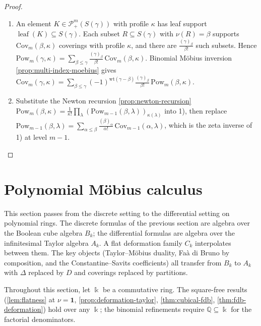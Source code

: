 \documentclass[10pt,a4paper]{article}
\theoremstyle{plain}
\theoremstyle{definition}
\newcommand{\IQ}{\mathbb{Q}} %
\newcommand{\ik}{\Bbbk} %
\newcommand{\1}{\mathbb{1}} %
\newcommand{\KP}{\mathcal{P}}
\newcommand{\Cov}{\mathrm{Cov}} %
\DeclareMathOperator{\lf}{\mathrm{leaf}} %
\begin{document}
\begin{proof}

\begin{enumerate}
\def\labelenumi{\arabic{enumi})}
\item
  An element \(K \in \KP_+^m(S(\gamma))\) with profile \(\kappa\) has
  leaf support \(\lf(K) \subseteq S(\gamma)\). Each subset
  \(R \subseteq S(\gamma)\) with \(\nu(R) = \beta\) supports
  \(\Cov_m(\beta, \kappa)\) coverings with profile \(\kappa\), and there
  are \(\frac{(\gamma)_\beta}{\beta!}\) such subsets. Hence
  \(\mathrm{Pow}_m(\gamma, \kappa) = \sum_{\beta \leq \gamma} \frac{(\gamma)_\beta}{\beta!}\, \Cov_m(\beta, \kappa)\).
  Binomial Möbius inversion \ref{prop:multi-index-moebius} gives
  \(\Cov_m(\gamma, \kappa) = \sum_{\beta \leq \gamma} (-1)^{\mathrm{wt}(\gamma-\beta)} \frac{(\gamma)_\beta}{\beta!}\, \mathrm{Pow}_m(\beta, \kappa)\).
\item
  Substitute the Newton recursion \ref{prop:newton-recursion}
  \(\mathrm{Pow}_m(\beta, \kappa) = \frac{1}{\kappa!} \prod_\lambda (\mathrm{Pow}_{m-1}(\beta, \lambda))_{\kappa(\lambda)}\)
  into 1), then replace
  \(\mathrm{Pow}_{m-1}(\beta, \lambda) = \sum_{\alpha \leq \beta} \frac{(\beta)_\alpha}{\alpha!}\, \Cov_{m-1}(\alpha, \lambda)\),
  which is the zeta inverse of 1) at level \(m-1\).
\end{enumerate}

\end{proof}

\section{Polynomial Möbius
calculus}\label{polynomial-muxf6bius-calculus}

This section passes from the discrete setting to the differential
setting on polynomial rings. The discrete formulas of the previous
section are algebra over the Boolean cube algebra \(B_k\); the
differential formulas are algebra over the infinitesimal Taylor algebra
\(A_k\). A flat deformation family \(C_k\) interpolates between them.
The key objects (Taylor--Möbius duality, Faà di Bruno by composition,
and the Constantine--Savits coefficients) all transfer from \(B_k\) to
\(A_k\) with \(\Delta\) replaced by \(D\) and coverings replaced by
partitions.

Throughout this section, let \(\ik\) be a commutative ring. The
square-free results (\ref{lem:flatness} at \(\nu = \mathbf{1}\),
\ref{prop:deformation-taylor}, \ref{thm:cubical-fdb},
\ref{thm:fdb-deformation}) hold over any \(\ik\); the binomial
refinements require \(\IQ \subseteq \ik\) for the factorial
denominators.
\end{document}
